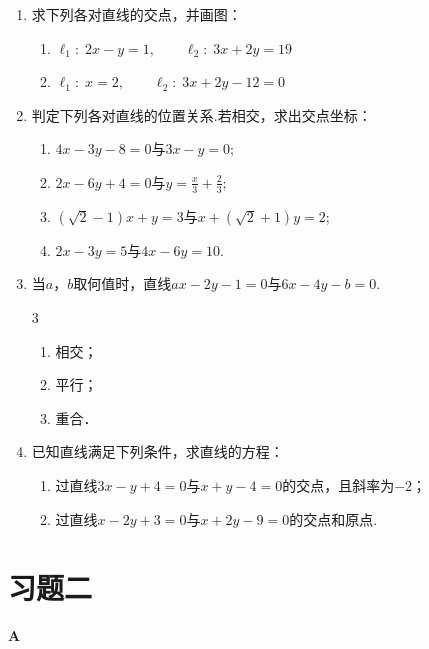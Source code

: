 \begin{ex}
\begin{enumerate}
    \item 求下列各对直线的交点，并画图：
\begin{enumerate}[(1)]
    \item $\ell_1:\; 2x-y=1,\qquad \ell_2:\; 3x+2y=19$
    \item $\ell_1:\; x=2,\qquad \ell_2:\; 3x+2y-12=0$
\end{enumerate}

    \item 判定下列各对直线的位置关系.若相交，求出交点坐标：
\begin{enumerate}[(1)]
\item $4x-3y-8=0$与$3x-y=0$;
\item $2x-6y+4=0$与$y=\frac{x}{3}+\frac{2}{3}$;
\item $(\sqrt{2}-1)x+y=3$与$x+(\sqrt{2}+1)y=2$;
\item $2x-3y=5$与$4x-6y=10$.
\end{enumerate}

    \item 当$a$，$b$取何值时，直线$ax-2y-1=0$与$6x-4y-b=0$.
\begin{multicols}{3}
\begin{enumerate}[(1)]
    \item 相交；
    \item 平行；
    \item 重合．
\end{enumerate}
\end{multicols}
    \item 已知直线满足下列条件，求直线的方程：
\begin{enumerate}[(1)]
\item 过直线$3x-y+4=0$与$x+y-4=0$的交点，且斜率为$-2$；
\item 过直线$x-2y+3=0$与$x+2y-9=0$的交点和原点.
\end{enumerate}

\end{enumerate}
\end{ex}

\section*{习题二}
\begin{center}
    \bfseries A
\end{center}

